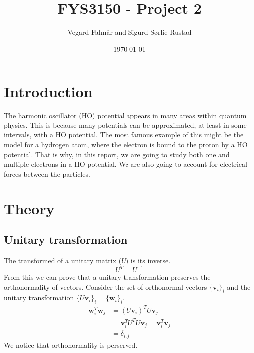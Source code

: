 \documentclass[reprint,english,notitlepage]{revtex4-1}  %
\begin{document}
\title{FYS3150 - Project 2}
\date{\today}               
\author{Vegard Falmår and Sigurd Sørlie Rustad}

\newpage

\begin{abstract}

\end{abstract}
\maketitle


\section{Introduction}

The harmonic oscillator (HO) potential appears in many areas within quantum physics. This is because many potentials can be approximated, at least in some intervals, with a HO potential. The most famous example of this might be the model for a hydrogen atom, where the electron is bound to the proton by a HO potential. That is why, in this report, we are going to study both one and multiple electrons in a HO potential. We are also going to account for electrical forces between the particles.

 

\section{Theory}

\subsection{Unitary transformation}
The transformed of a unitary matrix ($U$) is its inverse.
\begin{equation*}
	U^T = U^{-1}
\end{equation*}
From this we can prove that a unitary transformation preserves the orthonormality of vectors. Consider the set of orthonormal vectors $\{ \mathbf{v}_i \}_i$ and the unitary transformation $\{ U\mathbf{v}_i \}_i = \{ \mathbf{w}_i \}_i$.
\begin{align*}
	\mathbf{w}_i^T\mathbf{w}_j &= (U\mathbf{v}_i)^TU\mathbf{v}_j \\
	&= \mathbf{v}_i^TU^TU\mathbf{v}_j = \mathbf{v}_i^T\mathbf{v}_j \\
	&= \delta_{i,j}
\end{align*}
We notice that orthonormality is perserved.
\end{document}
